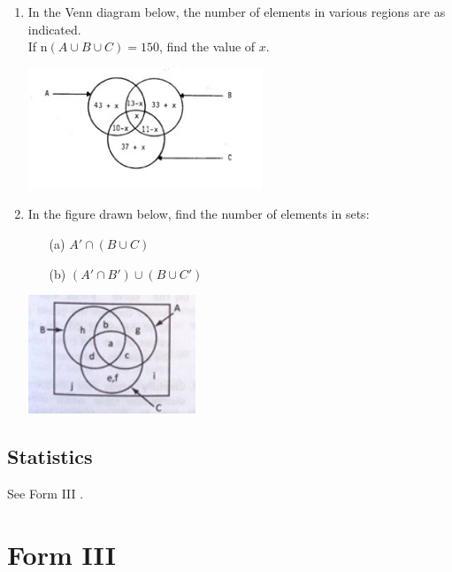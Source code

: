 \begin{enumerate}
	\item In the Venn diagram below, the number of elements in various regions are as indicated.\\
	If n$(A \cup B \cup C) = 150$, find the value of $x$.
	
	\begin{center}
	\includegraphics[width=7cm]{./img/set2.jpg}
	\end{center}
	
	\item In the figure drawn below, find the number of elements in sets:
		\begin{itemize}
		\item[(a)] $A' \cap (B \cup C)$
		\item[(b)] $(A' \cap B') \cup (B \cup C')$
		\end{itemize}
		
	\begin{center}
	\includegraphics[width=5cm]{./img/set3.jpg}
	\end{center}
	

\end{enumerate}


	\subsection{Statistics}
	
	See Form III .


\section{Form III}

